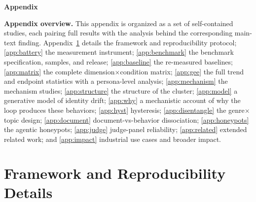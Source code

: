 \clearpage
\appendix

\setcounter{page}{1}
\setcounter{section}{0}
\setcounter{subsection}{0}
\setcounter{subsubsection}{0}
\setcounter{figure}{0}
\setcounter{table}{0}
\setcounter{equation}{0}


{
\begin{center}
{\LARGE\bfseries Appendix\par}
\end{center}
}

\noindent\textbf{Appendix overview.} This appendix is organized as a set of self-contained studies, each pairing full results with the analysis behind the corresponding main-text finding. Appendix~\ref{app:repro} details the framework and reproducibility protocol; \ref{app:battery} the measurement instrument; \ref{app:benchmark} the benchmark specification, samples, and release; \ref{app:baseline} the re-measured baselines; \ref{app:matrix} the complete dimension$\times$condition matrix; \ref{app:gee} the full trend and endpoint statistics with a persona-level analysis; \ref{app:mechanism} the mechanism studies; \ref{app:structure} the structure of the cluster; \ref{app:model} a generative model of identity drift; \ref{app:why} a mechanistic account of why the loop produces these behaviors; \ref{app:hyst} hysteresis; \ref{app:disentangle} the genre$\times$topic design; \ref{app:document} document-vs-behavior dissociation; \ref{app:honeypots} the agentic honeypots; \ref{app:judge} judge-panel reliability; \ref{app:related} extended related work; and \ref{app:impact} industrial use cases and broader impact.

\section{Framework and Reproducibility Details}
\label{app:repro}

